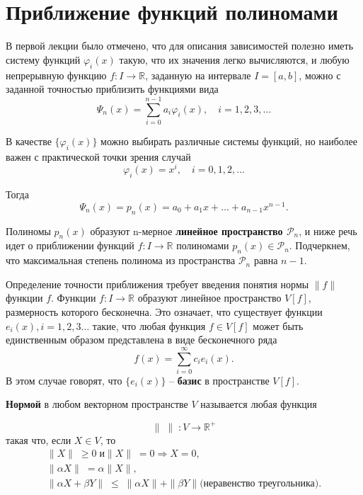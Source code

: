 \section{Приближение функций полиномами}
\label{lecture:2}

В первой лекции было отмечено, что для описания зависимостей полезно иметь систему функций $\varphi _i(x)$ такую, что их значения легко вычисляются, и любую непрерывную функцию $f: I \rightarrow \mathbb{R} $, заданную на интервале $ I = [a,b] $, можно с заданной точностью приблизить функциями вида 
\begin{equation} \label{eq:2.1}
\varPsi_n(x)=\sum_{i=0}^{n-1}{a_i\varphi_i(x)}, \quad i = 1, 2, 3, \dots
\end{equation}

В качестве $\{\varphi_i(x)\}$ можно выбирать различные системы функций, но наиболее важен с практической точки зрения случай 
\begin{equation}\label{eq:2.2}
\varphi _i(x) = x^i, \quad i = 0, 1, 2, \dots
\end{equation}

Тогда
\begin{equation}\label{eq:polynom}
\varPsi _n(x) = p_n(x) = a_0 + a_1x + \dots + a_{n-1}x^{n-1} .
\end{equation}


Полиномы $p_n(x)$ образуют n-мерное \textbf{линейное пространство $\mathscr{P}_n$}, и ниже речь идет о приближении функций  $f:I \rightarrow \mathbb{R} $ полиномами $p_n(x) \in \mathscr{P}_n $. Подчеркнем, что максимальная степень полинома из пространства  $\mathscr{P}_n$ равна $n - 1$.


Определение точности приближения требует введения понятия нормы $\parallel f \parallel$ функции $f$. 
Функции $f: I \rightarrow \mathbb{R} $ образуют линейное пространство $V[f]$, размерность которого бесконечна. Это означает, что существует функции $e_i(x), i = 1, 2, 3 \dots$ такие, что любая функция $f \in V[f]$ может быть единственным образом представлена в виде бесконечного ряда 
\begin{equation}
f(x) = \sum_{i=0}^{\infty} {c_i e_i(x)}.
\end{equation}
В этом случае говорят, что $\{e_i(x)\}$ -- \textbf{базис} в пространстве $V[f]$.

\textbf{Нормой} в любом векторном пространстве $V$ называется любая функция 
 
\begin{equation}
\parallel \; \parallel \; : V \rightarrow \mathbb{R}^+
\end{equation}
такая что, если $X\in V$, то
\begin{equation}
\begin{array}{l}
\parallel X \parallel \; \geq 0 \; \text{и}  \parallel X \parallel \; = 0 \Rightarrow X = 0 ,\\
\parallel \alpha X \parallel \; = \alpha \parallel X \parallel ,  \\ 
\parallel \alpha X + \beta Y\parallel \; \leq \; \parallel \alpha  X \parallel + \parallel \beta Y \parallel \text{(неравенство треугольника)}.
\end{array}
\end{equation}

